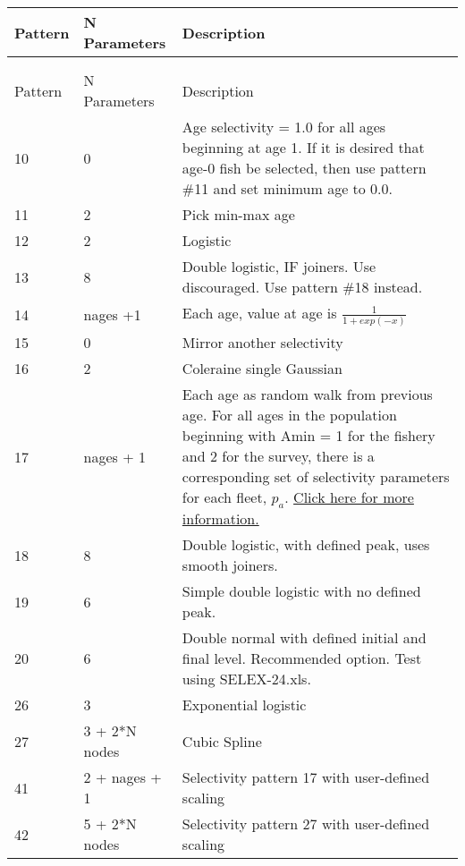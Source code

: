 \begin{center}
	\begin{longtable}{p{2cm} p{3cm} p{10cm}}

		\endfirsthead

		\hline
		Pattern & N Parameters & Description \\
		\hline
		\endhead

		\endfoot
		\endlastfoot

		\hline
		\multicolumn{3}{c}{AGE SELECTIVITY}\\
		   &   &  \\
		Pattern & N Parameters & Description \\
		\hline
		10 & 0 & Age selectivity = 1.0 for all ages beginning at age 1.  If it is desired that age-0 fish be selected, then use pattern \#11 and set minimum age to 0.0. \\
		11 & 2 & Pick min-max age\\
		12 & 2 & Logistic\\
		13 & 8 & Double logistic, IF joiners.  Use discouraged.  Use pattern \#18 instead.\\
		14 & nages  +1 & Each age, value at age is $\frac{1}{1+exp(-x)}$ \\
		15 & 0 & Mirror another selectivity\\
		16 & 2 & Coleraine single Gaussian\\
		17 & nages + 1 & Each age as random walk from previous age.  For all ages in the population beginning with Amin = 1 for the fishery and 2 for the survey, there is a corresponding set of selectivity parameters for each fleet, $p_a$. \hyperlink{RandWalk}{Click here for more information.}\\
		18 & 8 & Double logistic, with defined peak, uses smooth joiners.  \\
		19 & 6 & Simple double logistic with no defined peak.\\
		20 & 6 & Double normal with defined initial and final level.  Recommended option. Test using SELEX-24.xls.\\
		26 & 3 & Exponential logistic\\
		27 & 3 + 2*N nodes & Cubic Spline\\
		41 & 2 + nages + 1 & Selectivity pattern 17 with user-defined scaling \\
		42 & 5 + 2*N nodes & Selectivity pattern 27 with user-defined scaling \\
		\hline
	\end{longtable}
\end{center}

